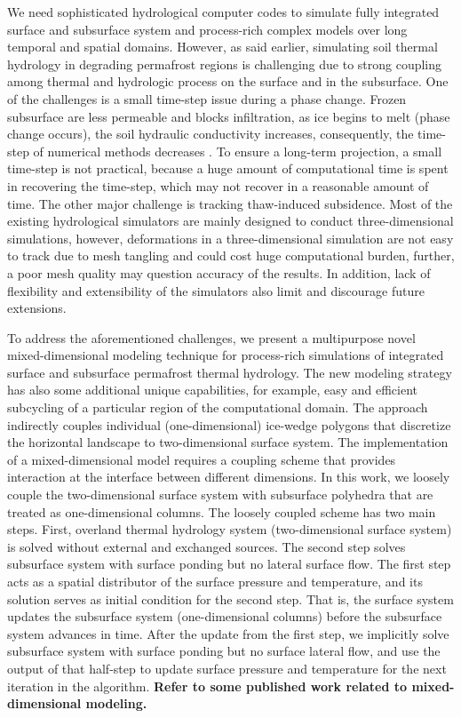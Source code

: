 \documentclass[review]{elsarticle}
\begin{document}
We need sophisticated hydrological computer codes to simulate fully integrated surface and subsurface system and process-rich complex models over long temporal and spatial domains. However, as said earlier, simulating soil thermal hydrology in degrading permafrost regions is challenging due to strong coupling among thermal and hydrologic process on the surface and in the subsurface. One of the challenges is a small time-step issue during a phase change. Frozen subsurface are less permeable and blocks infiltration, as ice begins to melt (phase change occurs), the soil hydraulic conductivity increases, consequently, the time-step of numerical methods decreases \cite{dall2011robust}. To ensure a long-term projection, a small time-step is not practical, because a huge amount of computational time is spent in recovering the time-step, which may not recover in a reasonable amount of time. The other major challenge is tracking thaw-induced subsidence. Most of the existing hydrological simulators are mainly designed to conduct three-dimensional simulations, however, deformations in a three-dimensional simulation are not easy to track due to mesh tangling and could cost huge computational burden, further, a poor mesh quality may question accuracy of the results. In addition, lack of flexibility and extensibility of the simulators also limit and discourage future extensions.

To address the aforementioned challenges, we present a multipurpose novel mixed-dimensional modeling technique for process-rich simulations of integrated surface and subsurface permafrost thermal hydrology. The new modeling strategy has also some additional unique capabilities, for example, easy and efficient subcycling of a particular region of the computational domain. The approach indirectly couples individual (one-dimensional) ice-wedge polygons that discretize the horizontal landscape to two-dimensional surface system. The implementation of a mixed-dimensional model requires a coupling scheme that provides interaction at the interface between different dimensions. In this work, we loosely couple the two-dimensional surface system with subsurface polyhedra that are treated as one-dimensional columns. The loosely coupled scheme has two main steps. First, overland thermal hydrology system (two-dimensional surface system) is solved without external and exchanged sources. The second step solves subsurface system with surface ponding but no lateral surface flow. The first step acts as a spatial distributor of the surface pressure and temperature, and its solution serves as initial condition for the second step. That is, the surface system updates the subsurface system (one-dimensional columns) before the subsurface system advances in time. After the update from the first step, we implicitly solve subsurface system with surface ponding but no surface lateral flow, and use the output of that half-step to update surface pressure and temperature for the next iteration in the algorithm. \textbf{Refer to some published work related to mixed-dimensional modeling.}
\end{document}
